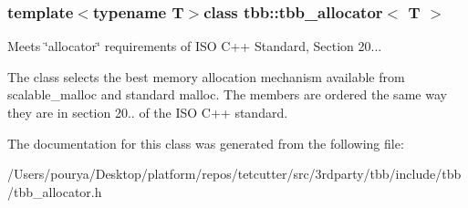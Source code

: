 \subsubsection*{template$<$typename T$>$class tbb\+::tbb\+\_\+allocator$<$ T $>$}

Meets \char`\"{}allocator\char`\"{} requirements of I\+S\+O C++ Standard, Section 20... 

The class selects the best memory allocation mechanism available from scalable\+\_\+malloc and standard malloc. The members are ordered the same way they are in section 20.. of the I\+S\+O C++ standard. 

The documentation for this class was generated from the following file\+:\begin{DoxyCompactItemize}
\item 
/\+Users/pourya/\+Desktop/platform/repos/tetcutter/src/3rdparty/tbb/include/tbb/tbb\+\_\+allocator.\+h\end{DoxyCompactItemize}

